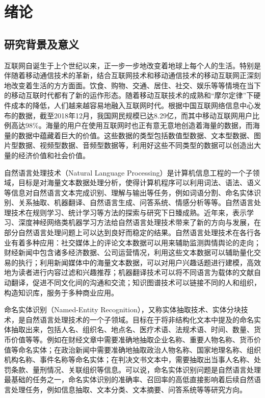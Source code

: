 \documentclass[winfonts,master,oneside,nobackinfo]{njuthesis}
\begin{document}
\chapter{绪论}\label{chapter_introduction}
\section{研究背景及意义}
互联网自诞生于上个世纪以来，正一步一步地改变着地球上每个人的生活。特别是伴随着移动通信技术的革新，结合互联网技术和移动通信技术的移动互联网正深刻地改变着生活的方方面面。饮食、购物、交通、居住、社交、娱乐等等情境在当下的移动互联时代都有了新的运作形态。随着移动互联技术的成熟和“摩尔定律”下硬件成本的降低，人们越来越容易地融入互联网时代。根据中国互联网络信息中心发布的数据，截至2018年12月，我国网民规模已达8.29亿，而其中移动互联网用户比例高达98\%。海量的用户在使用互联网时也正有意无意地创造着海量的数据，而海量的数据中蕴藏着巨大的价值。这些数据的类型包括数值型数据、文本型数据、图片型数据、视频型数据、音频型数据等，利用好这些不同类型的数据可以创造出大量的经济价值和社会价值。

自然语言处理技术（Natural Language Processing）是计算机信息工程的一个子领域，目标是对海量文本数据处理分析，使得计算机程序可以利用词法、语法、语义等信息对自然语言文本完成识别、理解与输出等任务，例如词语分割、命名实体识别、关系抽取、机器翻译、自然语言生成、问答系统、情感分析等等。自然语言处理技术在规则学习、统计学习等方法的探索与研究下日臻成熟。近年来，表示学习、深度神经网络类机器学习方法给自然语言处理技术带来了新的方向与发展，在部分自然语言处理问题上可以达到良好而稳定的结果。自然语言处理技术在各行各业有着多种应用：社交媒体上的评论文本数据可以用来辅助监测舆情舆论的走向；财经新闻中包含诸多经济数据、公司运营情况，利用这些文本数据可以辅助量化交易的执行；利用新闻媒体中的海量文本数据，可以对用户兴趣话题进行建模，高效地为读者进行内容过滤和兴趣推荐；机器翻译技术可以将不同语言为载体的文献自动翻译，促进不同文化间的沟通和交流；知识图谱技术可以链接不同的人和组织，构造知识库，服务于多种商业应用。

命名实体识别（Named-Entity Recognition），又称实体抽取技术、实体分块技术，是自然语言处理技术的一个子领域。目标在于将非结构化文本中提及的命名实体抽取出来，包括人名、组织名、地点名、医疗术语、法规术语、时间、数量、货币价值等等。例如在财经文章中需要准确地抽取企业名称、重要人物名称、货币价值等命名实体；在政治新闻中需要准确地抽取政治人物名称、国家地理名称、组织机构名称、事件名称等命名实体；在判决文书文本中，需要抽取出当事人名称、处罚条款、量刑情况、关联组织等信息。可以说，命名实体识别问题是自然语言处理最基础的任务之一，命名实体识别的准确率、召回率的高低直接影响着后续自然语言处理任务，例如信息抽取、文本分类、文本摘要、问答系统等等研究方向。
\end{document}
